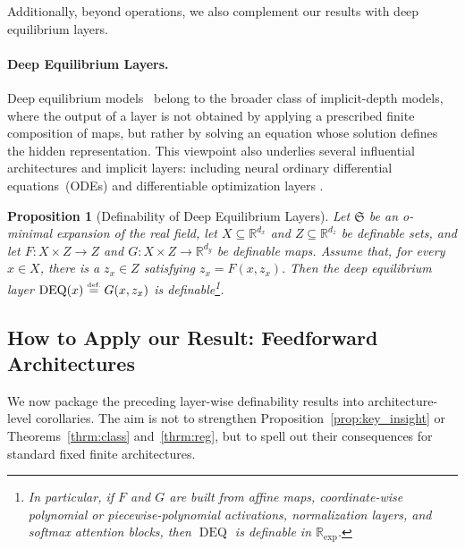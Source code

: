 \documentclass{article}
\newcommand{\eqdef}{\ensuremath{\stackrel{\mbox{\upshape\tiny def.}}{=}}}
\theoremstyle{plain}
\newtheorem{proposition}[theorem]{Proposition}
\theoremstyle{definition}
\theoremstyle{remark}
\theoremstyle{plain}
\numberwithin{thm}{section}
\theoremstyle{definition}
\numberwithin{equation}{section}
\begin{document}
Additionally, beyond operations, we also complement our results with deep equilibrium layers.

\paragraph{Deep Equilibrium Layers.}

Deep equilibrium models~\citep{bai2019deep} belong to the broader class of implicit-depth models, where the output of a layer is not obtained by applying a prescribed finite composition of maps, but rather by solving an equation whose solution defines the hidden representation.  This viewpoint also underlies several influential architectures and implicit layers: including neural ordinary differential equations~(ODEs) \citep{chen2018neural} and differentiable optimization layers \citep{amos2017optnet}.  

\begin{proposition}[Definability of Deep Equilibrium Layers]
\label{prop:deq_layers_definable}
Let $\mathfrak{S}$ be an o-minimal expansion of the real field, let
$X\subseteq\mathbb{R}^{d_x}$ and $Z\subseteq\mathbb{R}^{d_z}$ be
definable sets, and let
$
    F:X\times Z\to Z
$ and $
    G:X\times Z\to\mathbb{R}^{d_y}
$
be definable maps.  Assume that, for every $x\in X$, there
is a $z_x\in Z$ satisfying
$
    z_x = F(x,z_x).
$
Then the deep equilibrium layer
$
    \operatorname{DEQ}(x)
    \eqdef
        G(x,z_x)
$
is definable\footnote{In particular, if $F$ and $G$ are built from affine maps, coordinate-wise
polynomial or piecewise-polynomial activations, normalization layers, and
softmax attention blocks, then $\operatorname{DEQ}$ is definable in
$\mathbb{R}_{\exp}$.}.
\end{proposition}

\subsection{How to Apply our Result: Feedforward Architectures}
\label{s:Examples__ss:Architectures}
We now package the preceding layer-wise definability results into architecture-level corollaries.  The aim is not to strengthen Proposition~\ref{prop:key_insight} or Theorems~\ref{thrm:class} and~\ref{thrm:reg}, but to spell out their consequences for standard fixed finite architectures.  
\end{document}
